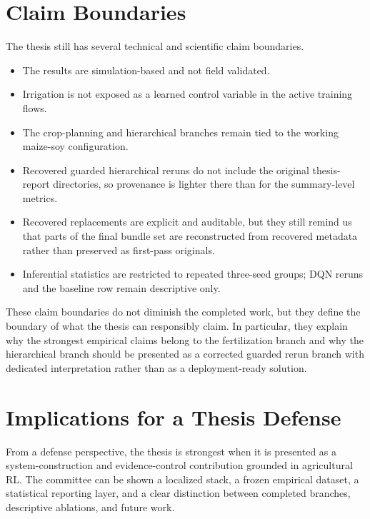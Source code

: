 \section{Claim Boundaries}

The thesis still has several technical and scientific claim boundaries.
\begin{itemize}[leftmargin=1.2cm]
    \item The results are simulation-based and not field validated.
    \item Irrigation is not exposed as a learned control variable in the active training flows.
    \item The crop-planning and hierarchical branches remain tied to the working maize-soy configuration.
    \item Recovered guarded hierarchical reruns do not include the original thesis-report directories, so provenance is lighter there than for the summary-level metrics.
    \item Recovered replacements are explicit and auditable, but they still remind us that parts of the final bundle set are reconstructed from recovered metadata rather than preserved as first-pass originals.
    \item Inferential statistics are restricted to repeated three-seed groups; DQN reruns and the baseline row remain descriptive only.
\end{itemize}



These claim boundaries do not diminish the completed work, but they define the boundary of what the thesis can responsibly claim. In particular, they explain why the strongest empirical claims belong to the fertilization branch and why the hierarchical branch should be presented as a corrected guarded rerun branch with dedicated interpretation rather than as a deployment-ready solution.

\section{Implications for a Thesis Defense}

From a defense perspective, the thesis is strongest when it is presented as a system-construction and evidence-control contribution grounded in agricultural RL. The committee can be shown a localized stack, a frozen empirical dataset, a statistical reporting layer, and a clear distinction between completed branches, descriptive ablations, and future work.


